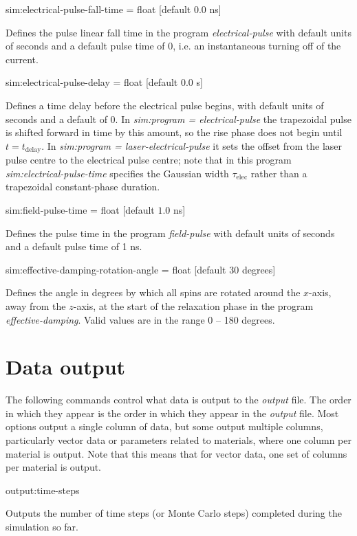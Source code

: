 {\zicf sim:electrical-pulse-fall-time = float [default $0.0$ ns]}
Defines the pulse linear fall time in the program \textit{electrical-pulse} with
 default units of seconds and a default pulse time of 0, i.e. an instantaneous
 turning off of the current.

{\zicf sim:electrical-pulse-delay = float [default $0.0$ s]}
Defines a time delay before the electrical pulse begins, with default units of seconds and a default of 0.
In \textit{sim:program = electrical-pulse} the trapezoidal pulse is shifted forward in time by this amount,
so the rise phase does not begin until $t = t_\mathrm{delay}$.
In \textit{sim:program = laser-electrical-pulse} it sets the offset from the laser pulse centre to the
electrical pulse centre; note that in this program \textit{sim:electrical-pulse-time} specifies the
Gaussian width $\tau_\mathrm{elec}$ rather than a trapezoidal constant-phase duration.

 {\zicf sim:field-pulse-time = float [default $1.0$ ns]}
 Defines the pulse time in the program \textit{field-pulse} with default
 units of seconds and a default pulse time of 1 ns.

 {\zicf sim:effective-damping-rotation-angle = float [default $30$ degrees]}
 Defines the angle in degrees by which all spins are rotated around the $x$-axis,
 away from the $z$-axis, at the start of the relaxation phase in the program
 \textit{effective-damping}. Valid values are in the range 0 -- 180 degrees.

\section*{Data output}
The following commands control what data is output to the \textit{output} file. The order in which they appear is the order in which they appear in the \textit{output} file. Most options output a single column of data, but some output multiple columns, particularly vector data or parameters related to materials, where one column per material is output. Note that this means that for vector data, one set of columns per material is output.

{\zicf output:time-steps} Outputs the number of time steps (or Monte Carlo steps) completed during the simulation so far.

